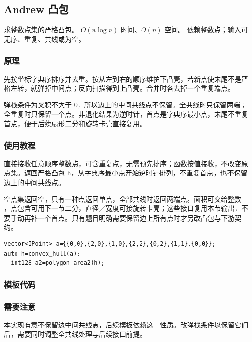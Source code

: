 \subsection{Andrew 凸包}
\label{geo:convex-hull}
\AlgorithmInfo
    {求整数点集的严格凸包。}
    {$O(n\log n)$ 时间、$O(n)$ 空间。}
    {依赖整数点；输入可无序、重复、共线或为空。}
\subsubsection*{原理}

先按坐标字典序排序并去重。按从左到右的顺序维护下凸壳，若新点使末尾不是严格左转，就弹掉中间点；反向扫描得到上凸壳。合并时各去掉一个重复端点。

弹栈条件为叉积不大于 0，所以边上的中间共线点不保留。全共线时只保留两端；全重复时只保留一个点。非退化结果为逆时针，首点是字典序最小点，末尾不重复首点，便于后续扇形二分和旋转卡壳直接复用。

\subsubsection*{使用教程}
 直接接收任意顺序整数点，可含重复点，无需预先排序；函数按值接收，不改变原点集。返回严格凸包 h，从字典序最小点开始逆时针排列，不重复首点，也不保留边上的中间共线点。

空点集返回空，只有一种点返回单点，全部共线时返回两端点。面积可交给整数 ，点包含可用下一节二分，直径／宽度可接旋转卡壳；这些接口复用本节输出，不要手动再补一个首点。只有题目明确需要保留边上所有点时才另改凸包与下游契约。
\begin{lstlisting}[style=mtycpp,numbers=none]
vector<IPoint> a={{0,0},{2,0},{1,0},{2,2},{0,2},{1,1},{0,0}};
auto h=convex_hull(a);
__int128 a2=polygon_area2(h);
\end{lstlisting}
\subsubsection*{模板代码}
\subsubsection*{需要注意}
本实现有意不保留边中间共线点，后续模板依赖这一性质。改弹栈条件以保留它们后，需要同时调整全共线处理与后续接口前提。
